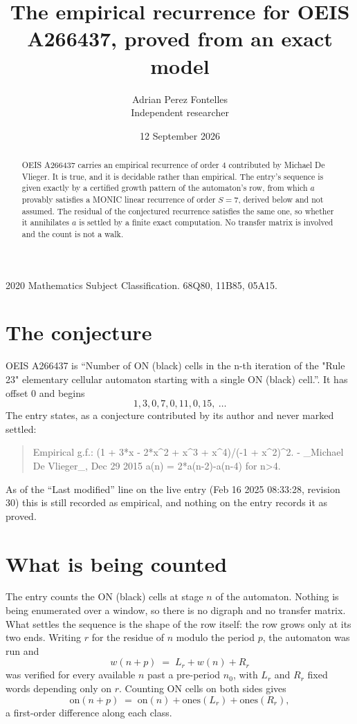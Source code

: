 \documentclass[11pt,a4paper]{article}
\title{The empirical recurrence for OEIS A266437, proved from an exact model}
\author{Adrian Perez Fontelles\\ \small Independent researcher}
\date{12 September 2026}
\theoremstyle{plain}
\theoremstyle{definition}
\begin{document}
\maketitle

\begin{abstract}
OEIS A266437 carries an empirical recurrence of order $4$ contributed by Michael De Vlieger. It is true, and it is
decidable rather than empirical. The entry's sequence is given exactly by a certified growth pattern of the automaton's row, from
which $a$ provably satisfies a MONIC linear recurrence of order $S=7$, derived below and not
assumed. The residual of the conjectured recurrence satisfies the same one, so whether it
annihilates $a$ is settled by a finite exact computation. No transfer matrix is involved and
the count is not a walk.
\end{abstract}

\noindent\small 2020 Mathematics Subject Classification. 68Q80, 11B85, 05A15.\normalsize

\section{The conjecture}

OEIS A266437 is ``Number of ON (black) cells in the n-th iteration of the "Rule 23" elementary cellular automaton starting with a single ON (black) cell.''. It has offset $0$ and begins
\[
1, 3, 0, 7, 0, 11, 0, 15,\ \dots
\]
The entry states, as a conjecture contributed by its author and never marked settled:
\begin{quote}
Empirical g.f.: (1 + 3*x - 2*x\^{}2 + x\^{}3 + x\^{}4)/(-1 + x\^{}2)\^{}2. - \_Michael De Vlieger\_, Dec 29 2015 a(n) = 2*a(n-2)-a(n-4) for n>4.
\end{quote}
As of the ``Last modified'' line on the live entry (Feb 16 2025 08:33:28, revision 30)
this is still recorded as empirical, and nothing on the entry records it as proved.

\section{What is being counted}

The entry counts the ON (black) cells at stage $n$ of the automaton. Nothing is being enumerated over a window, so there is
no digraph and no transfer matrix. What settles the sequence is the shape of the row itself:
the row grows only at its two ends. Writing
$r$ for the residue of $n$ modulo the period $p$, the automaton was run and
\[
w(n+p)\;=\;L_r + w(n) + R_r
\]
was verified for every available $n$ past a
pre-period $n_0$, with $L_r$ and $R_r$ fixed words depending only on $r$. Counting ON cells on
both sides gives
\[
\mathrm{on}(n+p)\;=\;\mathrm{on}(n)+\mathrm{ones}(L_r)+\mathrm{ones}(R_r),
\]
a first-order difference along each class.
\end{document}
